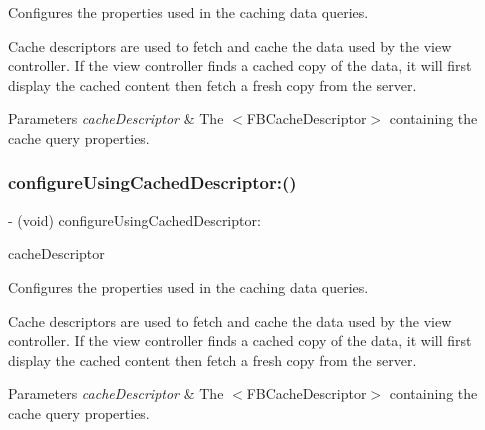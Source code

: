Configures the properties used in the caching data queries.

Cache descriptors are used to fetch and cache the data used by the view controller. If the view controller finds a cached copy of the data, it will first display the cached content then fetch a fresh copy from the server.


\begin{DoxyParams}{Parameters}
{\em cache\+Descriptor} & The $<$\+F\+B\+Cache\+Descriptor$>$ containing the cache query properties. \\
\hline
\end{DoxyParams}
\mbox{\label{interfaceFBPlacePickerViewController_a9822a782d9902415bcf142f4dc8f2c11}} 
\subsubsection{\texorpdfstring{configure\+Using\+Cached\+Descriptor\+:()}{configureUsingCachedDescriptor:()}\hspace{0.1cm}{\footnotesize\ttfamily [3/5]}}
{\footnotesize\ttfamily -\/ (void) configure\+Using\+Cached\+Descriptor\+: \begin{DoxyParamCaption}\item[{(\hyperlink{interfaceFBCacheDescriptor}{F\+B\+Cache\+Descriptor} $\ast$)}]{cache\+Descriptor }\end{DoxyParamCaption}}

Configures the properties used in the caching data queries.

Cache descriptors are used to fetch and cache the data used by the view controller. If the view controller finds a cached copy of the data, it will first display the cached content then fetch a fresh copy from the server.


\begin{DoxyParams}{Parameters}
{\em cache\+Descriptor} & The $<$\+F\+B\+Cache\+Descriptor$>$ containing the cache query properties. \\
\hline
\end{DoxyParams}
\mbox{\label{interfaceFBPlacePickerViewController_a9822a782d9902415bcf142f4dc8f2c11}} 
